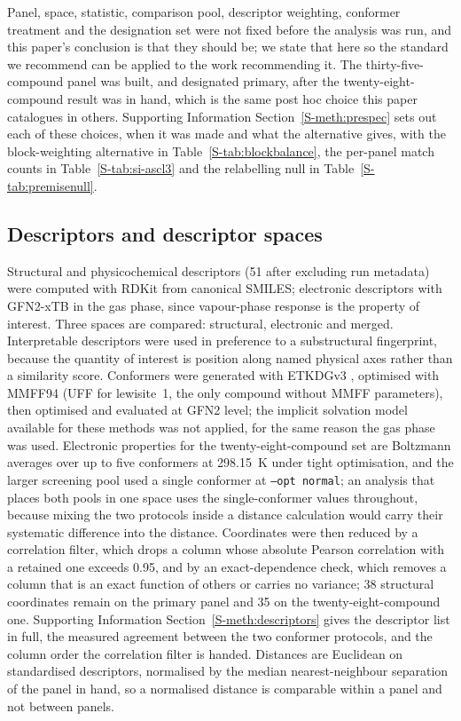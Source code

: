\documentclass[journal=ancham,manuscript=article,margin=1in]{achemso}
\begin{document}
Panel, space, statistic, comparison pool, descriptor weighting, conformer
treatment and the designation set were not fixed before the analysis was run, and this paper's conclusion is that they
should be; we state
that here so the standard we recommend can be applied to the work recommending
it. The thirty-five-compound panel was built, and designated primary, after the
twenty-eight-compound result was in hand, which is the same post hoc choice this
paper catalogues in others. Supporting Information
Section~\ref{S-meth:prespec} sets out each of these choices, when it was
made and what the alternative gives, with the block-weighting alternative in
Table~\ref{S-tab:blockbalance}, the per-panel match counts in
Table~\ref{S-tab:si-ascl3} and the relabelling null in
Table~\ref{S-tab:premisenull}.

\subsection{Descriptors and descriptor spaces}
Structural and physicochemical descriptors (51 after excluding run metadata)
were computed with RDKit \cite{rdkit} from canonical SMILES; electronic
descriptors with GFN2-xTB \cite{bannwarth2019} in the gas phase, since
vapour-phase response is the property of interest. Three spaces are compared:
structural, electronic and merged. Interpretable descriptors were used in
preference to a substructural fingerprint, because the quantity of interest is
position along named physical axes rather than a similarity score. Conformers were
generated with ETKDGv3 \cite{wang2020,riniker2015}, optimised with MMFF94
\cite{halgren1996} (UFF \cite{rappe1992} for lewisite~1, the only compound
without MMFF parameters), then optimised and evaluated at GFN2 level; the
implicit solvation model available for these methods \cite{ehlert2021} was not
applied, for the same reason the gas phase was used. Electronic properties for
the twenty-eight-compound set are Boltzmann averages over up to five conformers
at 298.15~K under tight optimisation, and the larger screening pool used a
single conformer at \texttt{--opt normal}; an analysis that places both pools
in one space uses the single-conformer values throughout, because mixing the
two protocols inside a distance calculation would carry their systematic
difference into the distance. Coordinates were then reduced by a correlation
filter, which drops a column whose absolute Pearson correlation with a retained
one exceeds 0.95, and by an exact-dependence check, which removes a column that
is an exact function of others or carries no variance; 38 structural coordinates
remain on the primary panel and 35 on the twenty-eight-compound one. Supporting
Information Section~\ref{S-meth:descriptors} gives the descriptor list in full,
the measured agreement between the two conformer protocols, and the column
order the correlation filter is handed. Distances are Euclidean on
standardised descriptors, normalised by the median nearest-neighbour separation
of the panel in hand, so a normalised distance is comparable within a panel and
not between panels.
\end{document}

